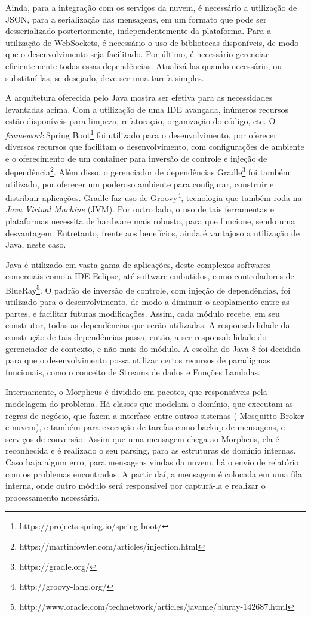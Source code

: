 Ainda, para a integração com os serviços da nuvem, é necessário a utilização de JSON, para a serialização das mensagens, em um formato que pode ser desserializado posteriormente, independentemente da plataforma. Para a utilização de WebSockets, é necessário o uso de bibliotecas disponíveis, de modo que o desenvolvimento seja facilitado. Por último, é necessário gerenciar eficientemente todas essas dependências. Atualizá-las quando necessário, ou substituí-las, se desejado, deve ser uma tarefa simples.

A arquitetura oferecida pelo Java mostra ser efetiva para as necessidades levantadas acima. Com a utilização de uma IDE avançada, inúmeros recursos estão disponíveis para limpeza, refatoração, organização do código, etc. O \textit{framework} Spring Boot\footnote{https://projects.spring.io/spring-boot/} foi utilizado para o desenvolvimento, por oferecer diversos recursos que facilitam o desenvolvimento, com configurações de ambiente e o oferecimento de um container para inversão de controle e injeção de dependência\footnote{https://martinfowler.com/articles/injection.html}. Além disso, o gerenciador de dependências Gradle\footnote{https://gradle.org/} foi também utilizado, por oferecer um poderoso ambiente para configurar, construir e distribuir aplicações. Gradle faz uso de Groovy\footnote{http://groovy-lang.org/}, tecnologia que também roda na \textit{Java Virtual Machine} (JVM). Por outro lado, o uso de tais ferramentas e plataformas necessita de hardware mais robusto, para que funcione, sendo uma desvantagem. Entretanto, frente aos benefícios, ainda é vantajoso a utilização de Java, neste caso.

Java é utilizado em vasta gama de aplicações, deste complexos softwares comerciais como a IDE Eclipse, até software embutidos, como controladores de BlueRay\footnote{http://www.oracle.com/technetwork/articles/javame/bluray-142687.html}.
O padrão de inversão de controle, com injeção de dependências, foi utilizado para o desenvolvimento, de modo a diminuir o acoplamento entre as partes, e facilitar futuras modificações. Assim, cada módulo recebe, em seu construtor, todas as dependências que serão utilizadas. A responsabilidade da construção de tais dependências passa, então, a ser responsabilidade do gerenciador de contexto, e não mais do módulo. A escolha do Java 8 foi decidida para que o desenvolvimento possa utilizar certos recursos de paradigmas funcionais, como o conceito de Streams de dados e Funções Lambdas.

Internamente, o Morpheus é dividido em pacotes, que responsáveis pela modelagem do problema. Há classes que modelam o domínio, que executam as regras de negócio, que fazem a interface entre outros sistemas (\wmqtt{} Mosquitto Broker e nuvem), e também para execução de tarefas como backup de mensagens, e serviços de conversão.
Assim que uma mensagem chega ao Morpheus, ela é reconhecida e é realizado o seu parsing, para as estruturas de domínio internas. Caso haja algum erro, para mensagens vindas da nuvem, há o envio de relatório com os problemas encontrados. A partir daí, a mensagem é colocada em uma fila interna, onde outro módulo será responsável por capturá-la e realizar o processamento necessário.

